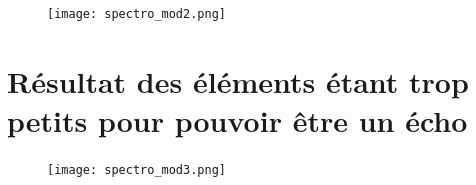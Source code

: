 \documentclass[11pt]{article}
\begin{document}
\begin{figure}[H]
    \begin{center}
        \texttt{[image: spectro\_mod2.png]}
    \end{center}
\end{figure}

\newpage

\section{Résultat des éléments étant trop petits pour pouvoir être un écho} \label{app:spectro-mod3}

\begin{figure}[h]
    \begin{center}
        \texttt{[image: spectro\_mod3.png]}
    \end{center}
\end{figure}








\end{document}
